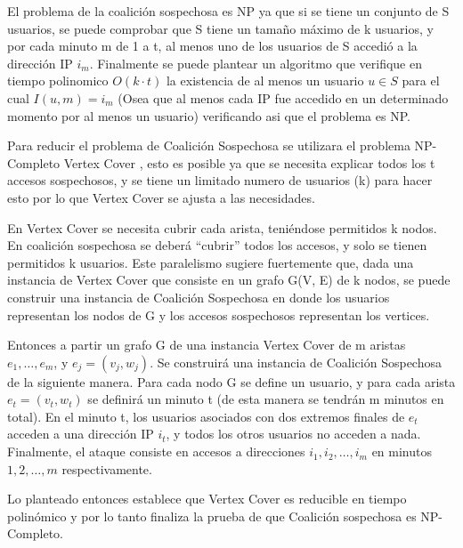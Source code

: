 El problema de la coalición sospechosa es NP ya que si se tiene un conjunto de S usuarios, se puede comprobar que S tiene un tamaño máximo de k usuarios, y por cada minuto m de 1 a t, al menos uno de los usuarios de S accedió a la dirección IP $i_m$. Finalmente se puede plantear un algoritmo que verifique en tiempo polinomico $O(k \cdot t)$ la existencia de al menos un usuario $u \in S$ para el cual $I(u,m)=i_m$ (Osea que al menos cada IP fue accedido en un determinado momento por al menos un usuario) verificando asi que el problema es NP.

Para reducir el problema de Coalición Sospechosa se utilizara el problema NP-Completo Vertex Cover \cite{vertexCover}, esto es posible ya que se necesita explicar todos los t accesos sospechosos, y se tiene un limitado numero de usuarios (k) para hacer esto por lo que Vertex Cover se ajusta a las necesidades.

En Vertex Cover se necesita cubrir cada arista, teniéndose permitidos k nodos. En coalición sospechosa se deberá ``cubrir'' todos los accesos, y solo se tienen permitidos k usuarios. Este paralelismo sugiere fuertemente que, dada una instancia de Vertex Cover que consiste en un grafo G(V, E) de k nodos, se puede construir una instancia de Coalición Sospechosa en donde los usuarios representan los nodos de G y los accesos sospechosos representan los vertices.

Entonces a partir un grafo G de una instancia Vertex Cover de m aristas $e_1,\ldots, e_m$, y $e_j=(v_j, w_j)$. Se construirá una instancia de Coalición Sospechosa de la siguiente manera. Para cada nodo G se define un usuario, y para cada arista $e_t=(v_t,w_t)$ se definirá un minuto t (de esta manera se tendrán m minutos en total). En el minuto t, los usuarios asociados con dos extremos finales de $e_t$ acceden a una dirección IP $i_t$, y todos los otros usuarios no acceden a nada. Finalmente, el ataque consiste en accesos a direcciones $i_1,i_2,\ldots,i_m$ en minutos $1, 2,\ldots,m$ respectivamente.

Lo planteado entonces establece que Vertex Cover es reducible en tiempo polinómico y por lo tanto finaliza la prueba de que Coalición sospechosa es NP-Completo.



